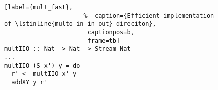 \begin{figure}[!t]
  \centering
  \begin{minipage}{\columnwidth}
    \begin{lstlisting}[label={mult_fast},
                      %  caption={Efficient implementation of \lstinline{multo in in out} direciton},
                       captionpos=b,
                       frame=tb]
multIIO :: Nat -> Nat -> Stream Nat
...
multIIO (S x') y = do
  r' <- multIIO x' y
  addXY y r'
    \end{lstlisting}
  \end{minipage}
\end{figure}
